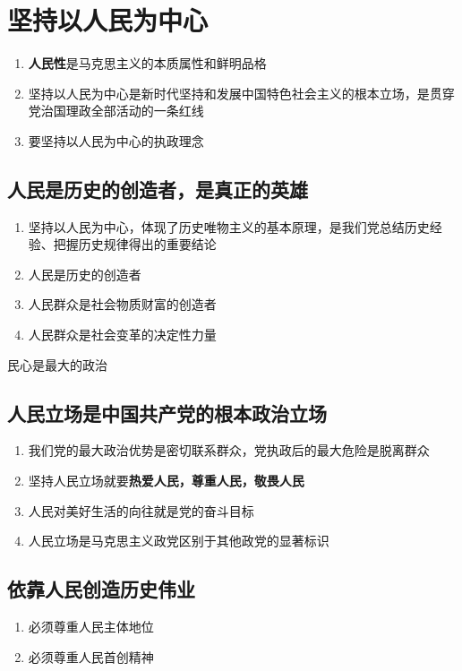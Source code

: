 \documentclass{ctexart}
\numberwithin{figure}{section}
\numberwithin{equation}{section}
\begin{document}
\section{坚持以人民为中心}
    \begin{enumerate}
        \item \textbf{人民性}是马克思主义的本质属性和鲜明品格
        \item 坚持以人民为中心是新时代坚持和发展中国特色社会主义的根本立场，是贯穿党治国理政全部活动的一条红线
        \item 要坚持以人民为中心的执政理念
    \end{enumerate}
    \subsection{人民是历史的创造者，是真正的英雄}
        \begin{enumerate}
            \item 坚持以人民为中心，体现了历史唯物主义的基本原理，是我们党总结历史经验、把握历史规律得出的重要结论
            \item 人民是历史的创造者
            \item 人民群众是社会物质财富的创造者
            \item 人民群众是社会变革的决定性力量 
        \end{enumerate}
    民心是最大的政治

    \subsection{人民立场是中国共产党的根本政治立场}
        \begin{enumerate}
            \item 我们党的最大政治优势是密切联系群众，党执政后的最大危险是脱离群众
            \item 坚持人民立场就要\textbf{热爱人民，尊重人民，敬畏人民}
            \item 人民对美好生活的向往就是党的奋斗目标
            \item 人民立场是马克思主义政党区别于其他政党的显著标识
        \end{enumerate}
        \subsection{依靠人民创造历史伟业}
        \begin{enumerate}
            \item 必须尊重人民主体地位
            \item 必须尊重人民首创精神
        \end{enumerate}
\end{document}
